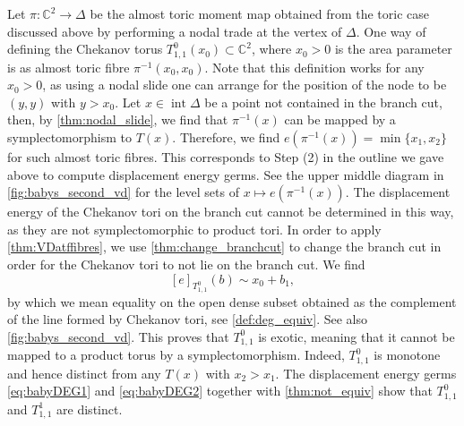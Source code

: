 \documentclass[12pt,a4paper,draft]{scrartcl}
\DeclareMathOperator{\interior}{int}
\begin{document}
Let $\pi \colon \mathbb{C}^2 \rightarrow \Delta$ be the almost toric moment map obtained from the toric case discussed above by performing a nodal trade at the vertex of $\Delta$.
One way of defining the Chekanov torus $T^0_{1,1}(x_0) \subset \mathbb{C}^2$, where $x_0 > 0$ is the area parameter is as almost toric fibre $\pi^{-1}(x_0,x_0)$.
Note that this definition works for any $x_0 >0$, as using a nodal slide one can arrange for the position of the node to be $(y,y)$ with $y > x_0$.
Let $x \in \interior\Delta$ be a point not contained in the branch cut, then, by \cref{thm:nodal_slide}, we find that $\pi^{-1}(x)$ can be mapped by a symplectomorphism to $T(x)$.
Therefore, we find $e(\pi^{-1}(x)) = \min \{x_1,x_2\}$ for such almost toric fibres.
This corresponds to Step (2) in the outline we gave above to compute displacement energy germs.
See the upper middle diagram in \cref{fig:babys_second_vd} for the level sets of $x \mapsto e(\pi^{-1}(x))$.
The displacement energy of the Chekanov tori on the branch cut cannot be determined in this way, as they are not symplectomorphic to product tori.
In order to apply \cref{thm:VDatffibres}, we use \cref{thm:change_branchcut} to change the branch cut in order for the Chekanov tori to not lie on the branch cut.
We find
\begin{equation}
    \label{eq:babyDEG2}
    [e]_{T^0_{1,1}}(b) \sim x_0 + b_1,
\end{equation}
by which we mean equality on the open dense subset obtained as the complement of the line formed by Chekanov tori, see \cref{def:deg_equiv}.
See also \cref{fig:babys_second_vd}.
This proves that $T^0_{1,1}$ is exotic, meaning that it cannot be mapped to a product torus by a symplectomorphism.
Indeed, $T^0_{1,1}$ is monotone and hence distinct from any $T(x)$ with $x_2 > x_1$.
The displacement energy germs \eqref{eq:babyDEG1} and \eqref{eq:babyDEG2} together with \cref{thm:not_equiv} show that $T^0_{1,1}$ and $T^1_{1,1}$ are distinct. 
\end{document}
